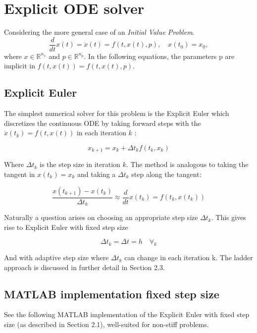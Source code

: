 \section{Explicit ODE solver}
Considering the more general case of an \textit{Initial Value Problem}.
$$
\frac{d}{d t} x(t)= \dot{x}(t)=f(t, x(t), p), \quad x\left(t_{0}\right)=x_{0},
$$
where $x \in \mathbb{R}^{n_{x}}$ and $p \in \mathbb{R}^{n_{p}}$. In the following equations, the parameters p are implicit in $f(t, x(t)) = f(t, x(t), p)$.

\subsection{Explicit Euler}
The simplest numerical solver for this problem is the Explicit Euler which discretizes the continuous ODE by taking forward steps with the $\dot{x}(t_k) = f(t, x(t))$ in each iteration $k$ \cite{JrgensenScientificEquations}:

\begin{equation}
    x_{k+1}=x_{k}+\Delta t_k f\left(t_{k}, x_{k}\right)
\end{equation}

Where $\Delta t_k$ is the step size in iteration $k$. The method is analogous to taking the tangent in $x(t_k) = x_k$ and taking a $\Delta t_k$ step along the tangent:

\begin{equation}
\frac{x\left(t_{k+1}\right)-x\left(t_{k}\right)}{\Delta t_{k}} \approx \frac{d}{d t} x\left(t_{k}\right)=f\left(t_{k}, x\left(t_{k}\right)\right)
\end{equation}

Naturally a question arises on choosing an appropriate step size $\Delta t_k$. This gives rise to Explicit Euler with fixed step size

\begin{equation*}
    \Delta t_k = \Delta t = h \quad \forall_k
\end{equation*}

And with adaptive step size where $\Delta t_k$ can change in each iteration k. The ladder approach is discussed in further detail in Section 2.3.

\subsection{MATLAB implementation fixed step size}
See the following MATLAB implementation of the Explicit Euler with fixed step size (as described in Section 2.1), well-suited for non-stiff problems.

